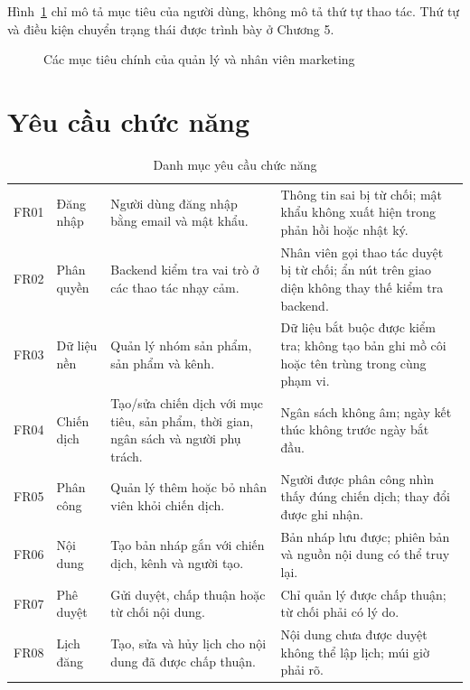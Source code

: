 Hình~\ref{fig:v8-usecase} chỉ mô tả mục tiêu của người dùng, không mô tả thứ tự thao tác. Thứ tự và điều kiện chuyển trạng thái được trình bày ở Chương 5.

\clearpage
\begin{figure}[p]
\centering

\caption{Các mục tiêu chính của quản lý và nhân viên marketing}
\label{fig:v8-usecase}
\end{figure}

\clearpage
\section{Yêu cầu chức năng}

\begin{table}[!htbp]
\centering
\small
\caption{Danh mục yêu cầu chức năng}\label{tab:v8-functional}
\renewcommand{\arraystretch}{1.04}
\begin{tabularx}{\textwidth}{|C{1.1cm}|L{2.2cm}|L{4.5cm}|Y|}
\hline
{} &  &  & \\
\hline
FR01 & Đăng nhập & Người dùng đăng nhập bằng email và mật khẩu. & Thông tin sai bị từ chối; mật khẩu không xuất hiện trong phản hồi hoặc nhật ký.\\
\hline
FR02 & Phân quyền & Backend kiểm tra vai trò ở các thao tác nhạy cảm. & Nhân viên gọi thao tác duyệt bị từ chối; ẩn nút trên giao diện không thay thế kiểm tra backend.\\
\hline
FR03 & Dữ liệu nền & Quản lý nhóm sản phẩm, sản phẩm và kênh. & Dữ liệu bắt buộc được kiểm tra; không tạo bản ghi mồ côi hoặc tên trùng trong cùng phạm vi.\\
\hline
FR04 & Chiến dịch & Tạo/sửa chiến dịch với mục tiêu, sản phẩm, thời gian, ngân sách và người phụ trách. & Ngân sách không âm; ngày kết thúc không trước ngày bắt đầu.\\
\hline
FR05 & Phân công & Quản lý thêm hoặc bỏ nhân viên khỏi chiến dịch. & Người được phân công nhìn thấy đúng chiến dịch; thay đổi được ghi nhận.\\
\hline
FR06 & Nội dung & Tạo bản nháp gắn với chiến dịch, kênh và người tạo. & Bản nháp lưu được; phiên bản và nguồn nội dung có thể truy lại.\\
\hline
FR07 & Phê duyệt & Gửi duyệt, chấp thuận hoặc từ chối nội dung. & Chỉ quản lý được chấp thuận; từ chối phải có lý do.\\
\hline
FR08 & Lịch đăng & Tạo, sửa và hủy lịch cho nội dung đã được chấp thuận. & Nội dung chưa được duyệt không thể lập lịch; múi giờ phải rõ.\\

\end{tabularx}
\end{table}
